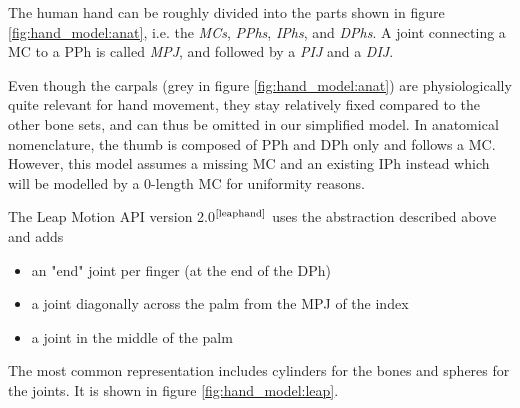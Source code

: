 \documentclass[hyperref, bachelorofscience]{cgvpub}
\newcommand{\newcite}[1]{$ ^{\text{\cite{#1}}} $}
\begin{document}
The human hand can be roughly divided into the parts shown in figure \ref{fig:hand_model:anat}, i.e. the \emph{\glspl{MC}}, \emph{\glspl{PPh}}, \emph{\glspl{IPh}}, and \emph{\glspl{DPh}}. A joint connecting a \gls{MC} to a \gls{PPh} is called \emph{\gls{MPJ}}, and followed by a \emph{\gls{PIJ}} and a \emph{\gls{DIJ}}.

Even though the carpals (grey in figure \ref{fig:hand_model:anat}) are physiologically quite relevant for hand movement, they stay relatively fixed compared to the other bone sets, and can thus be omitted in our simplified model. In anatomical nomenclature, the thumb is composed of \gls{PPh} and \gls{DPh} only and follows a \gls{MC}. However, this model assumes a missing \gls{MC} and an existing \gls{IPh} instead which will be modelled by a 0-length \gls{MC} for uniformity reasons.

The Leap Motion API version 2.0\newcite{leaphand} uses the abstraction described above and adds
\vspace{.3cm}
\begin{itemize}
	\item an "end" joint per finger (at the end of the \gls{DPh})
	\item a joint diagonally across the palm from the \gls{MPJ} of the index
	\item a joint in the middle of the palm
\end{itemize}

The most common representation includes cylinders for the bones and spheres for the joints. It is shown in figure \ref{fig:hand_model:leap}.
\end{document}
